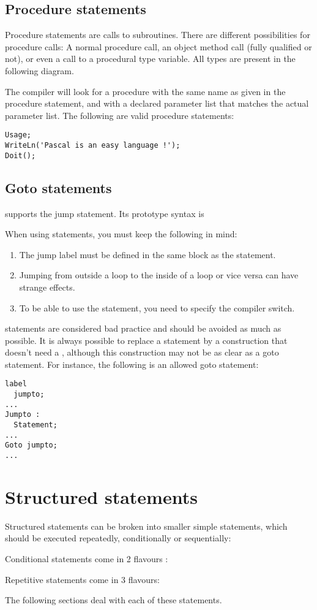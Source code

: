 \documentclass{report}
\begin{document}
\subsection{Procedure statements}
Procedure statements are calls to subroutines. There are
different possibilities for procedure calls: A normal procedure call, an
object method call (fully qualified or not), or even a call to a procedural
type variable. All types are present in the following diagram.

The \fpc compiler will look for a procedure with the same name as given in
the procedure statement, and with a declared parameter list that matches the
actual parameter list.
The following are valid procedure statements:
\begin{verbatim}
Usage;
WriteLn('Pascal is an easy language !');
Doit();
\end{verbatim}
\subsection{Goto statements}
\fpc supports the  jump statement. Its prototype syntax is

When using  statements, you must keep the following in mind:
\begin{enumerate}
\item The jump label must be defined in the same block as the 
statement.
\item Jumping from outside a loop to the inside of a loop or vice versa can
 have strange effects.
\item To be able to use the  statement, you need to specify the
 compiler switch.
\end{enumerate}
 statements are considered bad practice and should be avoided as
much as possible. It is always possible to replace a  statement by a
construction that doesn't need a , although this construction may
not be as clear as a goto statement.
For instance, the following is an allowed goto statement:
\begin{verbatim}
label
  jumpto;
...
Jumpto :
  Statement;
...
Goto jumpto;
...
\end{verbatim}

\section{Structured statements}
Structured statements can be broken into smaller simple statements, which
should be executed repeatedly, conditionally  or sequentially:

Conditional statements come in 2 flavours :

Repetitive statements come in 3 flavours:

The following sections deal with each of these statements.
\end{document}
